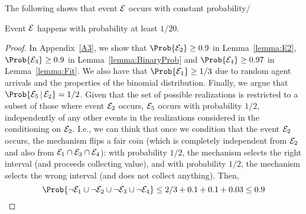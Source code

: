 The following shows that event $\mathcal{E}$ occurs with constant probability/

\begin{lemma}\label{lemma:GoodEvent}
    Event $\mathcal{E}$ happens with probability at least $1/20$.
\end{lemma}
\begin{proof}
In Appendix~\ref{A3}, we show that $\Prob{\Event_2} \ge 0.9$ in Lemma~\ref{lemma:E2}, $\Prob{\Event_3} \ge 0.9$ in Lemma~\ref{lemma:BinaryProb} and $\Prob{\Event_4} \geq 0.97$ in Lemma~\ref{lemma:Fit}.
We also have that $\Prob{\Event_1} \geq 1/3$ due to random agent arrivals and the properties of the binomial distribution. Finally, we argue that $\Prob{\Event_5\,|\,\Event_2} = 1/2$. Given that the set of possible realizations is restricted to a subset of those where event $\mathcal{E}_2$ occurs, $\mathcal{E}_5$ occurs with probability $1/2$, independently of any other events in the realizations considered in the conditioning on $\mathcal{E}_2$. I.e., we can think that once we condition that the event $\mathcal{E}_2$ occurs, the mechanism flips a fair coin (which is completely independent from $\mathcal{E}_2$ and also from $\mathcal{E}_1 \cap \mathcal{E}_3 \cap \mathcal{E}_4$): with probability $1/2$, the mechanism selects the right interval (and proceeds collecting value), and with probability $1/2$, the mechanism selects the wrong interval (and does not collect anything). Then, 
%
\[
\Prob{\lnot \Event_1 \cup \lnot \Event_2 \cup \lnot \Event_3 \cup \lnot \Event_4} \leq 2/3 + 0.1 +0.1 + 0.03 \leq 0.9 \]

\end{proof}
